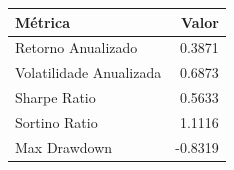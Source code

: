 \begin{tabular}{lr}
\toprule
M\'etrica & Valor \\
\midrule
Retorno Anualizado & 0.3871 \\
Volatilidade Anualizada & 0.6873 \\
Sharpe Ratio & 0.5633 \\
Sortino Ratio & 1.1116 \\
Max Drawdown & -0.8319 \\
\bottomrule
\end{tabular}